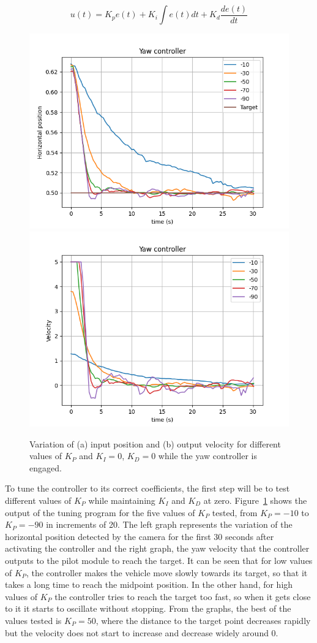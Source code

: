 \begin{equation}
    u(t)= K_p e(t) + K_i \int{e(t)dt} + K_d \frac{de(t)}{dt}
    \label{eq:pid}
\end{equation}
        

\begin{figure}
  \centering
  \includegraphics[width=.45\linewidth]{img/pid/yaw/yaw_pos_prop_i0_d0.png}
  \includegraphics[width=.45\linewidth]{img/pid/yaw/yaw_vel_prop_i0_d0.png}
  \caption{Variation of (a) input position and (b) output velocity for different values of $K_{P}$ and $K_I=0$, $K_D=0$ while the yaw controller is engaged.}\label{fig:tune-yaw-prop}
\end{figure}

To tune the controller to its correct coefficients, the first step will be to test different values of $K_{P}$ while maintaining $K_{I}$ and $K_{D}$ at zero.
Figure~\ref{fig:tune-yaw-prop} shows the output of the tuning program for the five values of $K_{P}$ tested, from $K_P=-10$ to $K_P=-90$ in increments of 20.
The left graph represents the variation of the horizontal position detected by the camera for the first 30 seconds after activating the controller and the right graph, the yaw velocity that the controller outputs to the pilot module to reach the target.
It can be seen that for low values of $K_{P}$, the controller makes the vehicle move slowly towards its target, so that it takes a long time to reach the midpoint position.
In the other hand, for high values of $K_{P}$ the controller tries to reach the target too fast, so when it gets close to it it starts to oscillate without stopping.
From the graphs, the best of the values tested is $K_{P}=50$, where the distance to the target point decreases rapidly but the velocity does not start to increase and decrease widely around 0.

